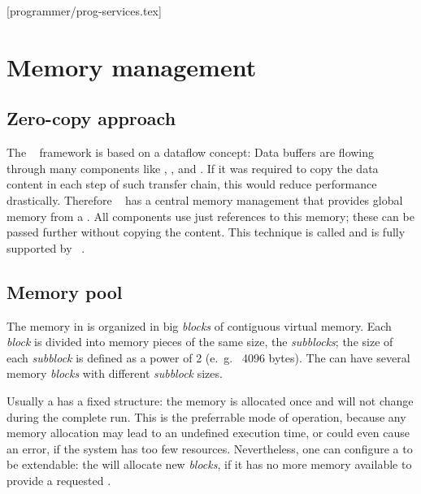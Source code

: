 [programmer/prog-services.tex]

\section{Memory management}
\label{prog_services_memory}


\subsection{Zero-copy approach}
The \dabc~ framework is based on a dataflow concept: Data buffers are 
flowing through many components like , , 
and . 
If it was required to copy the data content
in each step of such transfer chain,
this would reduce performance drastically. 
Therefore \dabc~ has a central memory management that provides
global memory  from a .
All components use just references to this memory;
these can be passed further without copying the content. 
This technique is called  and is fully supported by \dabc~.


\subsection{Memory pool}
\label{prog_services_memory_pool}
The memory in  is organized in big {\em blocks} of 
contiguous virtual memory.
Each {\em block} is divided into memory pieces of the same size, 
the {\em subblocks}; the size of each {\em subblock} is defined as 
a power of 2 (e.~g.~ 4096 bytes). The  can have 
several memory {\em blocks} with different {\em subblock} sizes.



Usually a  has a fixed structure: the memory is allocated once 
and will not change during the complete run. 
This is the preferrable mode of operation, because any 
memory allocation may lead to an undefined execution time,
or could even cause an error, if the system has too few resources. 
Nevertheless, one can configure a  to be extendable:
the  will allocate new {\em blocks}, 
if it has no more memory available to provide a requested .   

